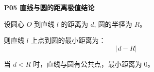 \begin{statementbox}
\textbf{P05 直线与圆的距离极值结论}

设圆心 $O$ 到直线 $l$ 的距离为 $d$,
圆的半径为 $R$。

则直线 $l$ 上点到圆的最小距离为：
\[
|d-R|
\]

当 $d<R$ 时，直线与圆有公共点，最小距离为 $0$。
\end{statementbox}
